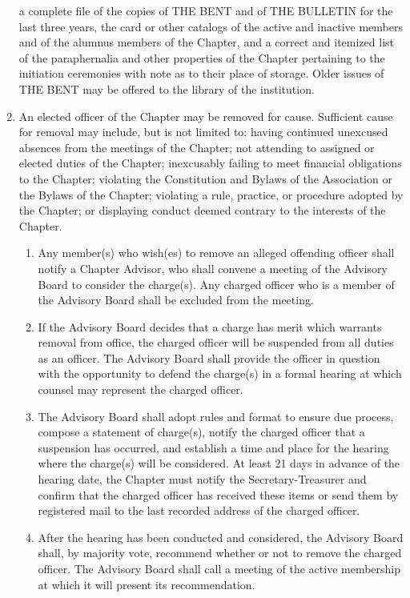 \begin{optionalpart}
\begin{enumerate}
a complete file of the copies of THE BENT and of THE BULLETIN for the last three years, 
the card or other catalogs of the active and inactive members and of the alumnus members 
of the Chapter, and a correct and itemized list of the paraphernalia and other properties of 
the Chapter pertaining to the initiation ceremonies with note as to their place of storage. 
Older issues of THE BENT may be offered to the library of the institution.
\item An elected officer of the Chapter may be removed for cause. Sufficient cause for 
removal may include, but is not limited to: having continued unexcused absences from the
meetings of the Chapter; not attending to assigned or elected duties of the Chapter; inexcusably 
failing to meet financial obligations to the Chapter; violating the Constitution and Bylaws of 
the Association or the Bylaws of the Chapter; violating a rule, practice, or procedure adopted 
by the Chapter; or displaying conduct deemed contrary to the interests of the Chapter. 
\begin{enumerate}
\item Any member(s) who wish(es) to remove an alleged offending officer shall notify a Chapter 
Advisor, who shall convene a meeting of the Advisory Board to consider the charge(s). Any 
charged officer who is a member of the Advisory Board shall be excluded from the meeting.
\item If the Advisory Board decides that a charge has merit which warrants removal from 
office, the charged officer will be suspended from all duties as an officer. The Advisory 
Board shall provide the officer in question with the opportunity to defend the charge(s) in 
a formal hearing at which counsel may represent the charged officer.
\item The Advisory Board shall adopt rules and format to ensure due process, compose a statement 
of charge(s), notify the charged officer that a suspension has occurred, and establish a time and place 
for the hearing where the charge(s) will be considered. At least 21 days in advance of the hearing date, 
the Chapter must notify the Secretary-Treasurer and confirm that the charged officer has received 
these items or send them by registered mail to the last recorded address of the charged officer.
\item After the hearing has been conducted and considered, the Advisory Board shall, by 
majority vote, recommend whether or not to remove the charged officer. The Advisory Board 
shall call a meeting of the active membership at which it will present its recommendation.

\end{enumerate}
\end{enumerate}
\end{optionalpart}
